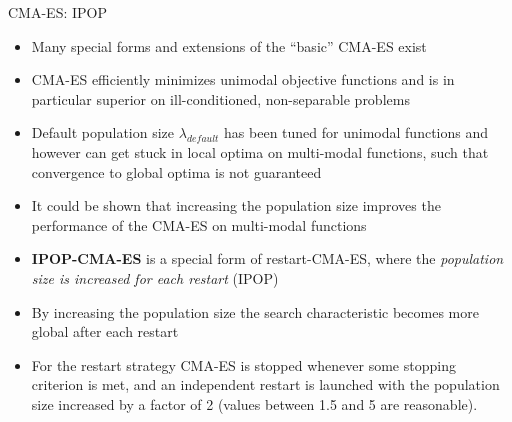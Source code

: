 \documentclass[11pt,compress,t,notes=noshow, xcolor=table]{beamer}
\begin{document}
\begin{vbframe}{CMA-ES: IPOP}
\footnotesize{
\begin{itemize}
\item Many special forms and extensions of the \enquote{basic} CMA-ES exist
\item CMA-ES efficiently minimizes unimodal objective functions and is in particular superior on ill-conditioned, non-separable problems
\item Default population size $\lambda_{default}$ has been tuned for unimodal
functions and however can get stuck in local optima on multi-modal functions, such that convergence to global optima is not guaranteed
\item It could be shown that increasing the population size improves the performance of the CMA-ES on multi-modal functions
\item \textbf{IPOP-CMA-ES} is a special form of restart-CMA-ES, where the \textit{population size is increased for each restart} (IPOP)
\item By increasing the population size the search characteristic becomes more global after each restart
\item For the restart strategy CMA-ES is stopped whenever some stopping criterion is met, and an independent restart is launched with the population size increased by a factor of 2 (values between 1.5 and 5 are reasonable).
\end{itemize}
}
\end{vbframe}
\end{document}
